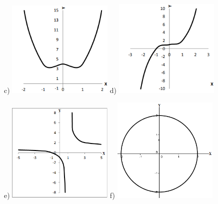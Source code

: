 \begin{respostas}{2}
\begin{figure}[H]
	c) \includegraphics[width=0.45\textwidth]{capitulos/funcao_do_primeiro_grau/media/image38.png} 
	d) \includegraphics[width=0.45\textwidth]{capitulos/funcao_do_primeiro_grau/media/image39.png}
\end{figure}

\begin{figure}[H]
	e) \includegraphics[width=0.45\textwidth]{capitulos/funcao_do_primeiro_grau/media/image40.png} 
	f) \includegraphics[width=0.45\textwidth]{capitulos/funcao_do_primeiro_grau/media/image41.png}
\end{figure}


\end{respostas}
